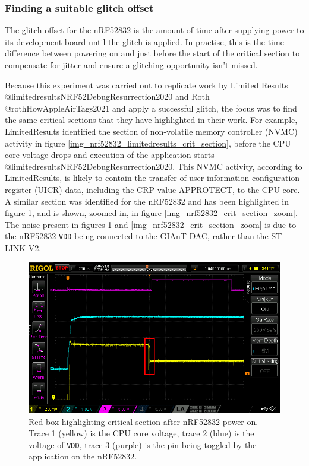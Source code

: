 \hypertarget{finding-a-suitable-glitch-offset}{%
\subsubsection{\texorpdfstring{Finding a suitable glitch
offset\label{section_nrf52832_suitable_offset}}{Finding a suitable glitch offset}}\label{finding-a-suitable-glitch-offset}}

The glitch offset for the nRF52832 is the amount of time after supplying
power to its development board until the glitch is applied. In practise,
this is the time difference between powering on and just before the
start of the critical section to compensate for jitter and ensure a
glitching opportunity isn't missed.

Because this experiment was carried out to replicate work by Limited
Results @limitedresultsNRF52DebugResurrection2020 and Roth
@rothHowAppleAirTags2021 and apply a successful glitch, the focus was to
find the same critical sections that they have highlighted in their
work. For example, LimitedResults identified the section of non-volatile
memory controller (NVMC) activity in figure
\ref{img_nrf52832_limitedresults_crit_section}, before the CPU core
voltage drops and execution of the application starts
@limitedresultsNRF52DebugResurrection2020. This NVMC activity, according
to LimitedResults, is likely to contain the transfer of user information
configuration register (UICR) data, including the CRP value APPROTECT,
to the CPU core. A similar section was identified for the nRF52832 and
has been highlighted in figure \ref{img_nrf52832_crit_section_no_zoom},
and is shown, zoomed-in, in figure \ref{img_nrf52832_crit_section_zoom}.
The noise present in figures \ref{img_nrf52832_crit_section_no_zoom} and
\ref{img_nrf52832_crit_section_zoom} is due to the nRF52832 \texttt{VDD}
being connected to the GIAnT DAC, rather than the ST-LINK V2.

\begin{figure}
\centering
\includegraphics[width=5.72917in,height=\textheight]{res/nrf52832_crit_section_no_zoom_highlight.png}
\caption{Red box highlighting critical section after nRF52832 power-on.
Trace 1 (yellow) is the CPU core voltage, trace 2 (blue) is the voltage
of \texttt{VDD}, trace 3 (purple) is the pin being toggled by the
application on the nRF52832.\label{img_nrf52832_crit_section_no_zoom}}
\end{figure}

